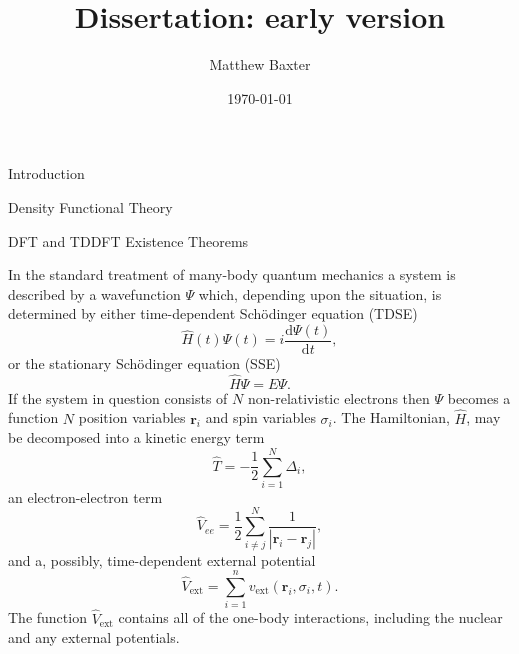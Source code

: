 \documentclass[letterpaper, 11 pt]{article}
\title{Dissertation: early version}
\author{Matthew Baxter}
\date{\today}
\begin{document}
\maketitle

\begin{section}{Introduction \label{sec:intro}}

\end{section}

\begin{section}{Density Functional Theory \label{chap:dft}}

   \begin{subsection}{DFT and TDDFT Existence Theorems \label{sec:dft}}

      In the standard treatment of many-body quantum mechanics a system is described by a wavefunction
      $\Psi$ which, depending upon the situation, is determined by either time-dependent Sch\"{o}dinger
      equation (TDSE)
      \begin{equation} \label{eq:tdse}
         \hat{H}(t) \Psi(t) = i \frac{\mathrm{d} \Psi(t)}{\mathrm{d} t},
      \end{equation}
      or the stationary Sch\"{o}dinger equation (SSE)
      \begin{equation} \label{eq:sse}
         \hat{H} \Psi = E \Psi.
      \end{equation}
      If the system in question consists of $N$ non-relativistic electrons then $\Psi$ becomes a
      function $N$ position variables $\mathbf{r}_i$ and spin variables $\sigma_i$. The Hamiltonian,
      $\hat{H}$, may be decomposed into a kinetic energy term
      \begin{equation} \label{eq:Top} %
         \hat{T} = -\frac{1}{2} \sum\limits^{N}_{i=1} \Delta_i,
      \end{equation}
      an electron-electron term
      \begin{equation} \label{eq:Vee} %
         \hat{V}_{ee} = \frac{1}{2} \sum\limits^{N}_{i \neq j}
                        \frac{1}{\left| \mathbf{r}_i - \mathbf{r}_j \right|},
      \end{equation}
      and a, possibly, time-dependent external potential
      \begin{equation} \label{eq:Vext}
         \hat{V}_\mathrm{ext} = \sum\limits^{n}_{i = 1} v_\mathrm{ext} (\mathbf{r}_i, \sigma_i, t).
      \end{equation}
      The function $\hat{V}_\mathrm{ext}$ contains all of the one-body interactions, including the
      nuclear and any external potentials.


\end{subsection}
\end{section}
\end{document}
